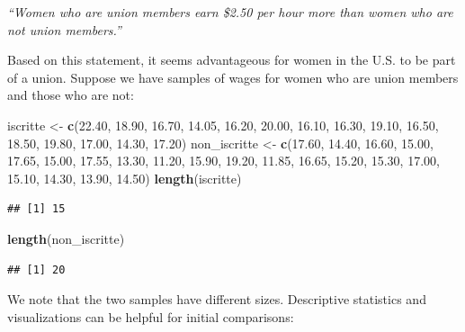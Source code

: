 \documentclass[
]{article}
\newenvironment{Shaded}{\begin{snugshade}}{\end{snugshade}}
\newcommand{\FloatTok}[1]{\textcolor[rgb]{0.00,0.00,0.81}{#1}}
\newcommand{\FunctionTok}[1]{\textcolor[rgb]{0.13,0.29,0.53}{\textbf{#1}}}
\newcommand{\NormalTok}[1]{#1}
\newcommand{\OtherTok}[1]{\textcolor[rgb]{0.56,0.35,0.01}{#1}}
\begin{document}
\emph{``Women who are union members earn \$2.50 per hour more than women
who are not union members.''}

Based on this statement, it seems advantageous for women in the U.S. to
be part of a union. Suppose we have samples of wages for women who are
union members and those who are not:

\begin{Shaded}
\begin{Highlighting}[]
\NormalTok{iscritte }\OtherTok{\textless{}{-}} \FunctionTok{c}\NormalTok{(}\FloatTok{22.40}\NormalTok{, }\FloatTok{18.90}\NormalTok{, }\FloatTok{16.70}\NormalTok{, }\FloatTok{14.05}\NormalTok{, }\FloatTok{16.20}\NormalTok{, }\FloatTok{20.00}\NormalTok{, }\FloatTok{16.10}\NormalTok{, }\FloatTok{16.30}\NormalTok{, }\FloatTok{19.10}\NormalTok{, }\FloatTok{16.50}\NormalTok{, }\FloatTok{18.50}\NormalTok{, }\FloatTok{19.80}\NormalTok{, }\FloatTok{17.00}\NormalTok{, }\FloatTok{14.30}\NormalTok{, }\FloatTok{17.20}\NormalTok{)}
\NormalTok{non\_iscritte }\OtherTok{\textless{}{-}} \FunctionTok{c}\NormalTok{(}\FloatTok{17.60}\NormalTok{, }\FloatTok{14.40}\NormalTok{, }\FloatTok{16.60}\NormalTok{, }\FloatTok{15.00}\NormalTok{, }\FloatTok{17.65}\NormalTok{, }\FloatTok{15.00}\NormalTok{, }\FloatTok{17.55}\NormalTok{, }\FloatTok{13.30}\NormalTok{, }\FloatTok{11.20}\NormalTok{, }\FloatTok{15.90}\NormalTok{, }\FloatTok{19.20}\NormalTok{, }\FloatTok{11.85}\NormalTok{, }\FloatTok{16.65}\NormalTok{, }\FloatTok{15.20}\NormalTok{, }\FloatTok{15.30}\NormalTok{, }\FloatTok{17.00}\NormalTok{, }\FloatTok{15.10}\NormalTok{, }\FloatTok{14.30}\NormalTok{, }\FloatTok{13.90}\NormalTok{, }\FloatTok{14.50}\NormalTok{)}
\FunctionTok{length}\NormalTok{(iscritte)}
\end{Highlighting}
\end{Shaded}

\begin{verbatim}
## [1] 15
\end{verbatim}

\begin{Shaded}
\begin{Highlighting}[]
\FunctionTok{length}\NormalTok{(non\_iscritte)}
\end{Highlighting}
\end{Shaded}

\begin{verbatim}
## [1] 20
\end{verbatim}

We note that the two samples have different sizes. Descriptive
statistics and visualizations can be helpful for initial comparisons:
\end{document}
